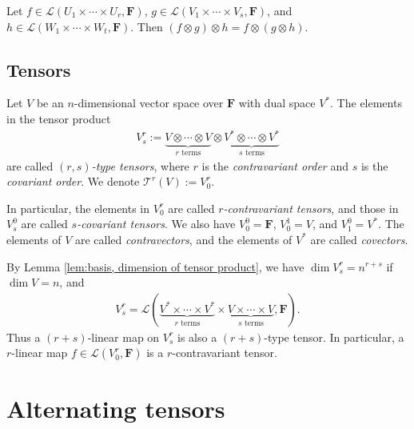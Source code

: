 \begin{theorem}
    Let $f \in \mathcal{L}(U_1 \times\cdots\times U_r, \mathbf{F})$, $g \in \mathcal{L}(V_1 \times\cdots\times V_s, \mathbf{F})$, and $h \in \mathcal{L}(W_1 \times\cdots\times W_t, \mathbf{F})$. Then $(f \otimes g) \otimes h = f \otimes (g \otimes h)$.
\end{theorem}

\subsection{Tensors}

\begin{definition}[Tensor]
    Let $V$ be an $n$-dimensional vector space over $\mathbf{F}$ with dual space $V^*$. The elements in the tensor product
    \begin{align*}
        V_s^r := \underbrace{V \otimes \cdots \otimes V}_{r \text{ terms}} \otimes \underbrace{V^* \otimes \cdots \otimes V^*}_{s \text{ terms}}
    \end{align*}
    are called \emph{$(r, s)$-type tensors}, where $r$ is the \emph{contravariant order} and $s$ is the \emph{covariant order}. We denote $\mathcal{T}^r(V) := V^r_0$.
\end{definition}

\begin{remark}
    In particular, the elements in $V_0^r$ are called \emph{$r$-contravariant tensors}, and those in $V_s^0$ are called \emph{$s$-covariant tensors}. We also have $V_0^0 = \mathbf{F}$, $V_0^1 = V$, and $V_1^0 = V^*$. The elements of $V$ are called \emph{contravectors}, and the elements of $V^*$ are called \emph{covectors}.
\end{remark}

By Lemma \ref{lem:basis, dimension of tensor product}, we have $\dim{V_s^r} = n^{r + s}$ if $\dim{V} = n$, and
    \begin{align*}
        V_s^r = \mathcal{L}(\underbrace{V^* \times \cdots \times V^*}_{r \text{ terms}} \times \underbrace{V \times \cdots \times V}_{s \text{ terms}}, \mathbf{F}).
    \end{align*}
Thus a $(r + s)$-linear map on $V^r_s$ is also a $(r + s)$-type tensor. In particular, a $r$-linear map $f \in \mathcal{L}(V_0^r, \mathbf{F})$ is a $r$-contravariant tensor.


\section{Alternating tensors}

